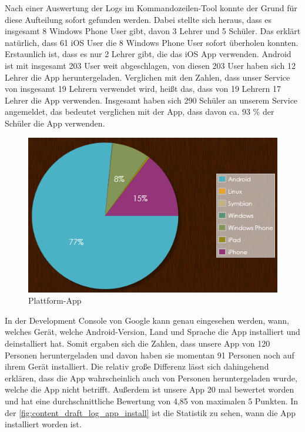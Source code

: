 Nach einer Auswertung der Logs im Kommandozeilen-Tool konnte der Grund für diese Aufteilung sofort gefunden werden. Dabei stellte sich heraus, dass es insgesamt 8 Windows Phone User gibt, davon 3 Lehrer und 5 Schüler. Das erklärt natürlich, dass 61 iOS User die 8 Windows Phone User sofort überholen konnten. Erstaunlich ist, dass es nur 2 Lehrer gibt, die das iOS App verwenden. Android ist mit insgesamt 203 User weit abgeschlagen, von diesen 203 User haben sich 12 Lehrer die App heruntergeladen. Verglichen mit den Zahlen, dass unser Service von insgesamt 19 Lehrern verwendet wird, heißt das, dass von 19 Lehrern 17 Lehrer die App verwenden. Insgesamt haben sich 290 Schüler an unserem Service angemeldet, das bedeutet verglichen mit der App, dass davon ca. 93 \% der Schüler die App verwenden. 
\begin{figure}[H]
\centering
\includegraphics[keepaspectratio=true, width=12cm]{images/screenshots/statistics/app_plattform.png}
\caption{Plattform-App}
\label{fig:content_draft_log_app}
\end{figure}

In der Development Console von Google kann genau eingesehen werden, wann, welches Gerät, welche Android-Version, Land und Sprache die App installiert und deinstalliert hat. Somit ergaben sich die Zahlen, dass unsere App von 120 Personen heruntergeladen und davon haben sie momentan 91 Personen noch auf ihrem Gerät installiert. Die relativ große Differenz lässt sich dahingehend erklären, dass die App wahrscheinlich auch von Personen heruntergeladen wurde, welche die App nicht betrifft. Außerdem ist unsere App 20 mal bewertet worden und hat eine durchschnittliche Bewertung von 4,85 von maximalen 5 Punkten. In der \autoref{fig:content_draft_log_app_install} ist die Statistik zu sehen, wann die App installiert worden ist.

